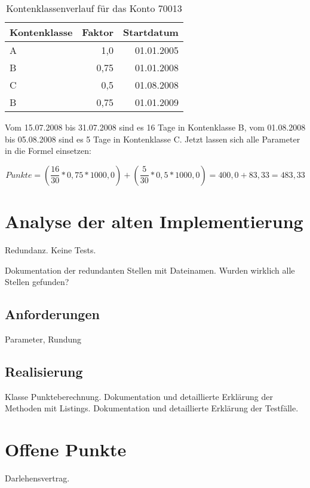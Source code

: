 \documentclass[12pt]{scrreprt}
\begin{document}
\begin{table}
  \begin{center}
    \begin{tabular}{|l|r|r|}
      \hline
      \textbf{Kontenklasse} & \textbf{Faktor} & \textbf{Startdatum}\\
      \hline
      A & 1,0 & 01.01.2005\\
      \hline
      B & 0,75 & 01.01.2008\\
      \hline
      C & 0,5 & 01.08.2008\\
      \hline
      B & 0,75 & 01.01.2009\\
      \hline
    \end{tabular}
    \caption{Kontenklassenverlauf für das Konto 70013}
  \end{center}
\end{table}
\vspace{2mm}

Vom 15.07.2008 bis 31.07.2008 sind es 16 Tage in Kontenklasse B, vom 01.08.2008 bis 05.08.2008 sind es  5 Tage in Kontenklasse C. Jetzt lassen sich alle Parameter in die Formel einsetzen:

\begin{equation*}
  Punkte = \left(\frac{16}{30} * 0,75 * 1000,0\right) + \left(\frac{5}{30} * 0,5 * 1000,0\right) = 400,0 + 83,33 = 483,33
\end{equation*}

\newpage



\section{Analyse der alten Implementierung}
Redundanz. 
Keine Tests.

Dokumentation der redundanten Stellen mit Dateinamen.
Wurden wirklich alle Stellen gefunden?

\subsection{Anforderungen}
Parameter, Rundung

\subsection{Realisierung}
Klasse Punkteberechnung.
Dokumentation und detaillierte Erklärung der Methoden mit Listings. 
Dokumentation und detaillierte Erklärung der Testfälle.

\section{Offene Punkte}
Darlehensvertrag.
\end{document}
